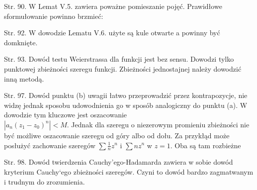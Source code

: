 \documentclass[a4paper,11pt]{article}
\begin{document}
\start Str. 90. W Lemat V.5. zawiera poważne pomieszanie pojęć.
Prawidłowe sformułowanie powinno brzmieć:

\start Str. 92. W dowodzie Lematu V.6. użyte są kule otwarte a powinny
być domknięte.

\start Str. 93. Dowód testu Weierstrassa dla funkcji jest bez sensu.
Dowodzi tylko punktowej zbieżności szeregu funkcji. Zbieżności
jednostajnej należy dowodzić inną metodą.

\start Str. 97. Dowód punktu (b) uwagii łatwo przeprowadzić przez
kontrapozycje, nie widzę jednak sposobu udowodnienia go w sposób
analogiczny do punktu (a). W dowodzie tym kluczowe jest oszacowanie
\\$|a_{n}(z_{1}-z_{0})^{n}|<M$. Jednak dla szeregu o niezerowym
promieniu zbieżności nie być możliwe oszacowanie szeregu od góry albo
od dołu. Za przykłąd może posłużyć zachowanie szeregów $\sum
\frac{1}{n}z^{n}$ i $\sum nz^{n}$ w $z=1$. Oba są tam rozbieżne

\start Str. 98. Dowód twierdzenia Cauchy'ego-Hadamarda zawiera w sobie
dowód kryterium Cauchy`ego zbieżności szeregów. Czyni to dowód bardzo
zagmatwanym i trudnym do zrozumienia.


\end{document}
